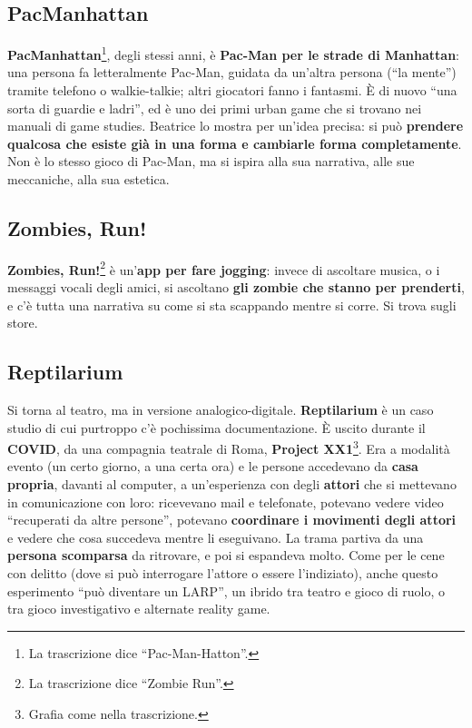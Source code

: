 \subsection{PacManhattan}



\textbf{PacManhattan}\footnote{La trascrizione dice ``Pac-Man-Hatton''.}, degli
stessi anni, è \textbf{Pac-Man per le strade di Manhattan}: una persona fa
letteralmente Pac-Man, guidata da un'altra persona (``la mente'') tramite
telefono o walkie-talkie; altri giocatori fanno i fantasmi. È di nuovo ``una
sorta di guardie e ladri'', ed è uno dei primi urban game che si trovano nei
manuali di game studies. Beatrice lo mostra per un'idea precisa: si può
\textbf{prendere qualcosa che esiste già in una forma e cambiarle forma
completamente}. Non è lo stesso gioco di Pac-Man, ma si ispira alla sua
narrativa, alle sue meccaniche, alla sua estetica.

\subsection{Zombies, Run!}

\textbf{Zombies, Run!}\footnote{La trascrizione dice ``Zombie Run''.} è
un'\textbf{app per fare jogging}: invece di ascoltare musica, o i messaggi
vocali degli amici, si ascoltano \textbf{gli zombie che stanno per prenderti}, e
c'è tutta una narrativa su come si sta scappando mentre si corre. Si trova sugli
store.

\subsection{Reptilarium}

Si torna al teatro, ma in versione analogico-digitale. \textbf{Reptilarium} è un
caso studio di cui purtroppo c'è pochissima documentazione. È uscito durante il
\textbf{COVID}, da una compagnia teatrale di Roma, \textbf{Project
XX1}\footnote{Grafia come nella trascrizione.}. Era a modalità evento (un certo
giorno, a una certa ora) e le persone accedevano da \textbf{casa propria}, davanti
al computer, a un'esperienza con degli \textbf{attori} che si mettevano in
comunicazione con loro: ricevevano mail e telefonate, potevano vedere video
``recuperati da altre persone'', potevano \textbf{coordinare i movimenti degli
attori} e vedere che cosa succedeva mentre li eseguivano. La trama partiva da una
\textbf{persona scomparsa} da ritrovare, e poi si espandeva molto. Come per le
cene con delitto (dove si può interrogare l'attore o essere l'indiziato), anche
questo esperimento ``può diventare un LARP'', un ibrido tra teatro e gioco di
ruolo, o tra gioco investigativo e alternate reality game.

